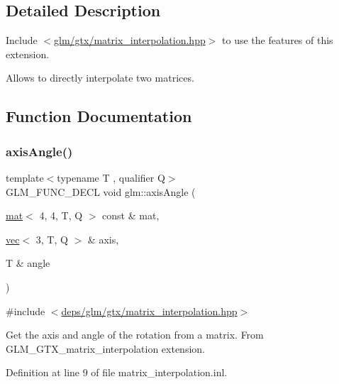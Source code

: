\subsection{Detailed Description}
Include $<$\hyperlink{matrix__interpolation_8hpp}{glm/gtx/matrix\+\_\+interpolation.\+hpp}$>$ to use the features of this extension.

Allows to directly interpolate two matrices. 

\subsection{Function Documentation}
\mbox{\label{group__gtx__matrix__interpolation_ga97f160158906ea89676f56cc4697ec98}} 
\subsubsection{\texorpdfstring{axis\+Angle()}{axisAngle()}}
{\footnotesize\ttfamily template$<$typename T , qualifier Q$>$ \\
G\+L\+M\+\_\+\+F\+U\+N\+C\+\_\+\+D\+E\+CL void glm\+::axis\+Angle (\begin{DoxyParamCaption}\item[{\hyperlink{structglm_1_1mat}{mat}$<$ 4, 4, T, Q $>$ const \&}]{mat,  }\item[{\hyperlink{structglm_1_1vec}{vec}$<$ 3, T, Q $>$ \&}]{axis,  }\item[{T \&}]{angle }\end{DoxyParamCaption})}



{\ttfamily \#include $<$\hyperlink{matrix__interpolation_8hpp}{deps/glm/gtx/matrix\+\_\+interpolation.\+hpp}$>$}

Get the axis and angle of the rotation from a matrix. From G\+L\+M\+\_\+\+G\+T\+X\+\_\+matrix\+\_\+interpolation extension. 

Definition at line 9 of file matrix\+\_\+interpolation.\+inl.

\mbox{\label{group__gtx__matrix__interpolation_ga992a5db71893ed1ba6ebac99f0f69831}} 
